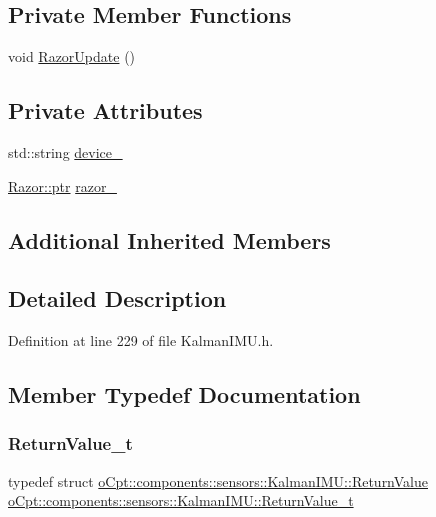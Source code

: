 \subsection*{Private Member Functions}
\begin{DoxyCompactItemize}
\item 
void \hyperlink{classo_cpt_1_1components_1_1sensors_1_1_kalman_i_m_u_a99b62a459b69b3b877d98dcb34b286d7}{Razor\+Update} ()
\end{DoxyCompactItemize}
\subsection*{Private Attributes}
\begin{DoxyCompactItemize}
\item 
std\+::string \hyperlink{classo_cpt_1_1components_1_1sensors_1_1_kalman_i_m_u_a483d7e4a39dce51d4bbd826fef6a9870}{device\+\_\+}
\item 
\hyperlink{classo_cpt_1_1i_sensor_a03533d2c5dc66e332d70dbb3b5e3006a}{Razor\+::ptr} \hyperlink{classo_cpt_1_1components_1_1sensors_1_1_kalman_i_m_u_a65e72cc0e903c472b2ddca84d227c50c}{razor\+\_\+}
\end{DoxyCompactItemize}
\subsection*{Additional Inherited Members}


\subsection{Detailed Description}


Definition at line 229 of file Kalman\+I\+M\+U.\+h.



\subsection{Member Typedef Documentation}
\hypertarget{classo_cpt_1_1components_1_1sensors_1_1_kalman_i_m_u_aa6de0f4077440823dc976d8e4bb63add}{}\label{classo_cpt_1_1components_1_1sensors_1_1_kalman_i_m_u_aa6de0f4077440823dc976d8e4bb63add} 
\subsubsection{\texorpdfstring{Return\+Value\+\_\+t}{ReturnValue\_t}}
{\footnotesize\ttfamily typedef struct \hyperlink{structo_cpt_1_1components_1_1sensors_1_1_kalman_i_m_u_1_1_return_value}{o\+Cpt\+::components\+::sensors\+::\+Kalman\+I\+M\+U\+::\+Return\+Value}  \hyperlink{classo_cpt_1_1components_1_1sensors_1_1_kalman_i_m_u_aa6de0f4077440823dc976d8e4bb63add}{o\+Cpt\+::components\+::sensors\+::\+Kalman\+I\+M\+U\+::\+Return\+Value\+\_\+t}}



